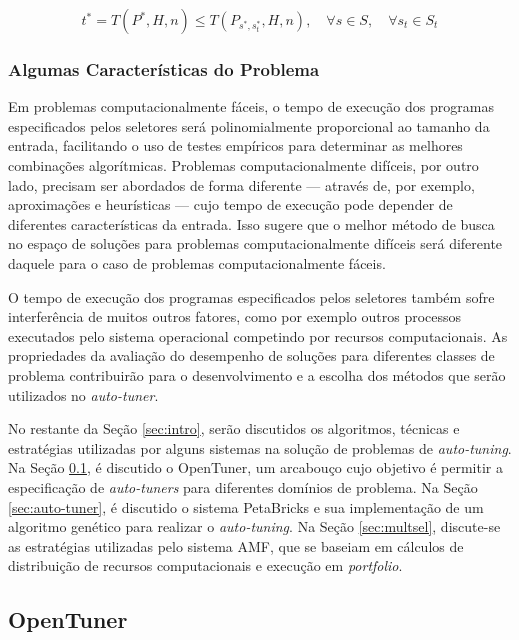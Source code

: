 \documentclass[a4paper, 12pt]{article}
\begin{document}
\begin{equation*}
    t^* = T(P^*,H,n) \leq T(P_{s^*,s_{t}^{*}},H,n), \quad \forall s \in S, \quad \forall s_t \in S_t
\end{equation*}

\subsubsection{Algumas Características do Problema}

Em problemas computacionalmente fáceis, o tempo de execução dos programas
especificados pelos seletores será polinomialmente proporcional ao tamanho da
entrada, facilitando o uso de testes empíricos para determinar as melhores
combinações algorítmicas. Problemas computacionalmente difíceis, por outro
lado, precisam ser abordados de forma diferente --- através de, por exemplo,
aproximações e heurísticas --- cujo tempo de execução pode depender de
diferentes características da entrada. Isso sugere que o melhor método de busca
no espaço de soluções para problemas computacionalmente difíceis será diferente
daquele para o caso de problemas computacionalmente fáceis.

O tempo de execução dos programas especificados pelos seletores também sofre
interferência de muitos outros fatores, como por exemplo outros processos
executados pelo sistema operacional competindo por recursos computacionais.
As propriedades da avaliação do desempenho de soluções para diferentes classes
de problema contribuirão para o desenvolvimento e a escolha dos métodos
que serão utilizados no \emph{auto-tuner}.

No restante da Seção \ref{sec:intro}, serão discutidos os algoritmos, técnicas
e estratégias utilizadas por alguns sistemas na solução de problemas de
\emph{auto-tuning}. Na Seção \ref{sec:opent}, é discutido o OpenTuner,
um arcabouço cujo objetivo é permitir a especificação de \emph{auto-tuners}
para diferentes domínios de problema. Na Seção \ref{sec:auto-tuner}, é discutido
o sistema PetaBricks e sua implementação de um algoritmo genético para realizar
o \emph{auto-tuning}. Na Seção \ref{sec:multsel}, discute-se as estratégias
utilizadas pelo sistema AMF, que se baseiam em cálculos de distribuição de
recursos computacionais e execução em \emph{portfolio}.

\subsection{OpenTuner} \label{sec:opent}
\end{document}
